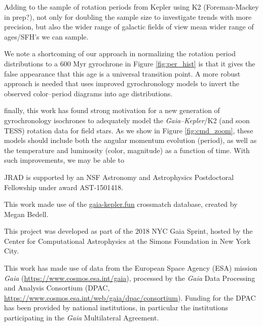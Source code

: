 \documentclass[preprint2]{aastex62}
\newcommand{\Kepler}{\textsl{Kepler}\xspace}
\begin{document}
Adding to the sample of rotation periods from Kepler using K2 (Foreman-Mackey in prep?), not only for doubling the sample size to investigate trends with more precision, but also the wider range of galactic fields of view mean wider range of ages/SFH's we can sample. 

We note a shortcoming of our approach in normalizing the rotation period distributions to a 600 Myr gyrochrone in Figure \ref{fig:per_hist} is that it gives the false appearance that this age is a universal transition point. A more robust approach is needed that uses improved gyrochronology models to invert the observed color--period diagrams into age distributions. 


finally, this work has found strong motivation for a new generation of gyrochronology isochrones to adequately model the {\em Gaia}--\Kepler/K2 (and soon TESS) rotation data for field stars. As we show in Figure \ref{fig:cmd_zoom}, these models should include both the angular momentum evolution (period), as well as the temperature and luminosity (color, magnitude) as a function of time. With such improvements, we may be able to 


\acknowledgments

JRAD is supported by an NSF Astronomy and Astrophysics Postdoctoral Fellowship under award AST-1501418. 

This work made use of the \url{gaia-kepler.fun} crossmatch database, created by Megan Bedell.

This project was developed as part of the 2018 NYC Gaia Sprint, hosted by the Center for Computational Astrophysics at the Simons Foundation in New York City.


This work has made use of data from the European Space Agency (ESA) mission
{\it Gaia} (\url{https://www.cosmos.esa.int/gaia}), processed by the {\it Gaia}
Data Processing and Analysis Consortium (DPAC,
\url{https://www.cosmos.esa.int/web/gaia/dpac/consortium}). Funding for the DPAC
has been provided by national institutions, in particular the institutions
participating in the {\it Gaia} Multilateral Agreement.




\end{document}
